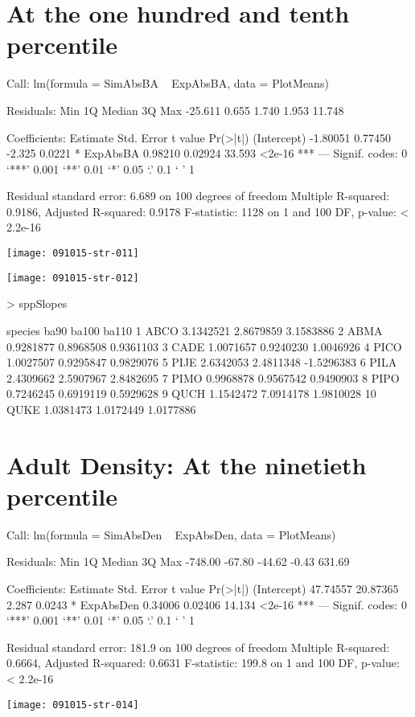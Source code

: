 \documentclass{article}
\begin{document}
\newpage
\section{At the one hundred and tenth percentile}
\begin{Schunk}
\begin{Soutput}
Call:
lm(formula = SimAbsBA ~ ExpAbsBA, data = PlotMeans)

Residuals:
    Min      1Q  Median      3Q     Max 
-25.611   0.655   1.740   1.953  11.748 

Coefficients:
            Estimate Std. Error t value Pr(>|t|)    
(Intercept) -1.80051    0.77450  -2.325   0.0221 *  
ExpAbsBA     0.98210    0.02924  33.593   <2e-16 ***
---
Signif. codes:  0 ‘***’ 0.001 ‘**’ 0.01 ‘*’ 0.05 ‘.’ 0.1 ‘ ’ 1

Residual standard error: 6.689 on 100 degrees of freedom
Multiple R-squared:  0.9186,	Adjusted R-squared:  0.9178 
F-statistic:  1128 on 1 and 100 DF,  p-value: < 2.2e-16
\end{Soutput}
\end{Schunk}
\texttt{[image: 091015-str-011]}

\texttt{[image: 091015-str-012]}
\begin{Schunk}
\begin{Sinput}
>   sppSlopes
\end{Sinput}
\begin{Soutput}
   species      ba90     ba100      ba110
1     ABCO 3.1342521 2.8679859  3.1583886
2     ABMA 0.9281877 0.8968508  0.9361103
3     CADE 1.0071657 0.9240230  1.0046926
4     PICO 1.0027507 0.9295847  0.9829076
5     PIJE 2.6342053 2.4811348 -1.5296383
6     PILA 2.4309662 2.5907967  2.8482695
7     PIMO 0.9968878 0.9567542  0.9490903
8     PIPO 0.7246245 0.6919119  0.5929628
9     QUCH 1.1542472 7.0914178  1.9810028
10    QUKE 1.0381473 1.0172449  1.0177886
\end{Soutput}
\end{Schunk}






\newpage

\section{Adult Density: At the ninetieth percentile}
\begin{Schunk}
\begin{Soutput}
Call:
lm(formula = SimAbsDen ~ ExpAbsDen, data = PlotMeans)

Residuals:
    Min      1Q  Median      3Q     Max 
-748.00  -67.80  -44.62   -0.43  631.69 

Coefficients:
            Estimate Std. Error t value Pr(>|t|)    
(Intercept) 47.74557   20.87365   2.287   0.0243 *  
ExpAbsDen    0.34006    0.02406  14.134   <2e-16 ***
---
Signif. codes:  0 ‘***’ 0.001 ‘**’ 0.01 ‘*’ 0.05 ‘.’ 0.1 ‘ ’ 1

Residual standard error: 181.9 on 100 degrees of freedom
Multiple R-squared:  0.6664,	Adjusted R-squared:  0.6631 
F-statistic: 199.8 on 1 and 100 DF,  p-value: < 2.2e-16
\end{Soutput}
\end{Schunk}
\texttt{[image: 091015-str-014]}
\end{document}
